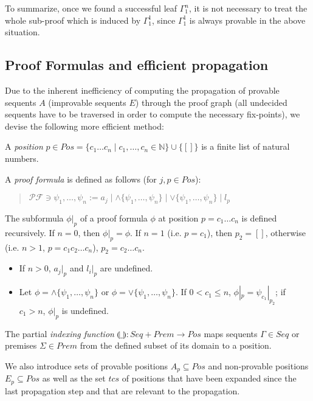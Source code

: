 \documentclass{llncs}
\newcommand{\ind}[1]{\llparenthesis #1 \rrparenthesis}
\begin{document}
To summarize, once we found a successful leaf $\Gamma^n_1$, it is not necessary to treat the whole sub-proof
which is induced by $\Gamma^1_1$, since $\Gamma^1_1$ is always provable in the above situation.

\subsection{Proof Formulas and efficient propagation}

Due to the inherent inefficiency of computing the propagation of provable
sequents $A$ (improvable sequents $E$) through the proof graph (all undecided
sequents have to be traversed in order to compute the necessary fix-points),
we devise the following more efficient method:

\begin{definition}
A \emph{position} $p\in Pos=\{c_1\ldots c_n\mid c_1,\ldots,c_n\in\mathbb{N}\}\cup\{[]\}$ is a finite
list of natural numbers.

A \emph{proof formula} is defined as follows (for $j,p\in Pos$):
\begin{quote}
$\mathcal{PF} \ni \psi_1,\ldots,\psi_n := a_j \mid \wedge \{\psi_1,\ldots,\psi_n\} \mid \vee \{\psi_1,\ldots,\psi_n\} \mid l_p$
\end{quote}

The subformula $\phi|_p$ of a proof formula $\phi$ at position $p=c_1\ldots c_n$ is defined
recursively. If $n=0$, then $\phi|_p=\phi$. If $n=1$ (i.e. $p=c_1$), then $p_2=[]$, otherwise
(i.e. $n>1$, $p=c_1c_2\ldots c_n$), $p_2=c_2\ldots c_n$.
\begin{itemize}
\item If $n>0$, $a_j|_p$ and $l_i|_p$ are undefined.
\item Let $\phi=\wedge \{\psi_1,\ldots,\psi_n\}$ or $\phi=\vee \{\psi_1,\ldots,\psi_n\}$. If $0<c_1\leq n$,
$\phi|_p=\psi_{c_1}|_{p_2}$; if $c_1>n$, $\phi|_p$ is undefined.
\end{itemize}

The partial \emph{indexing function} $\ind{\_}:Seq + Prem \rightarrow Pos$
maps sequents $\Gamma\in Seq$ or premises $\Sigma\in Prem$ from the defined
subset of its domain to a position.

We also introduce sets of provable positions $A_p\subseteq Pos$ and non-provable
positions $E_p\subseteq Pos$ as well as the set $tcs$ of positions that have been
expanded since the last propagation step and that are relevant to the propagation.
\end{definition}
\end{document}
